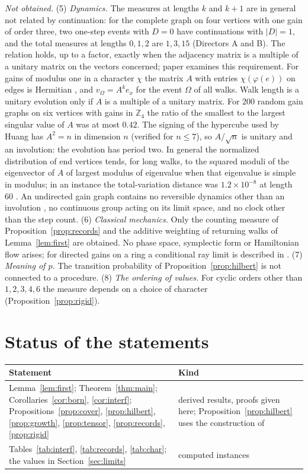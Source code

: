 \emph{Not obtained.} (5) \emph{Dynamics.} The measures at lengths $k$ and $k+1$ are in general not related by continuation: for the complete graph on four vertices with one gain of order three, two one-step events with $D=0$ have continuations with $|D|=1$, and the total measures at lengths $0,1,2$ are $1,3,15$ (Directors A and B). The relation holds, up to a factor, exactly when the adjacency matrix is a multiple of a unitary matrix on the vectors concerned; paper \cite{g9} examines this requirement. For gains of modulus one in a character $\chi$ the matrix $A$ with entries $\chi(\varphi(e))$ on edges is Hermitian \cite{reff,cdd}, and $v_\Omega=A^ke_x$ for the event $\Omega$ of all walks. Walk length is a unitary evolution only if $A$ is a multiple of a unitary matrix. For $200$ random gain graphs on six vertices with gains in $\mathbb{Z}_4$ the ratio of the smallest to the largest singular value of $A$ was at most $0.42$. The signing of the hypercube used by Huang \cite{huang} has $A^2=n$ in dimension $n$ (verified for $n\le7$), so $A/\sqrt n$ is unitary and an involution: the evolution has period two. In general the normalized distribution of end vertices tends, for long walks, to the squared moduli of the eigenvector of $A$ of largest modulus of eigenvalue when that eigenvalue is simple in modulus; in an instance the total-variation distance was $1.2\times10^{-8}$ at length $60$ \cite{comp2}. An undirected gain graph contains no reversible dynamics other than an involution \cite{g9}, no continuous group acting on its limit space, and no clock other than the step count. (6) \emph{Classical mechanics.} Only the counting measure of Proposition~\ref{prop:records} and the additive weighting of returning walks of Lemma~\ref{lem:first} are obtained. No phase space, symplectic form or Hamiltonian flow arises; for directed gains on a ring a conditional ray limit is described in \cite{g9}. (7) \emph{Meaning of $p$.} The transition probability of Proposition~\ref{prop:hilbert} is not connected to a procedure. (8) \emph{The ordering of values.} For cyclic orders other than $1,2,3,4,6$ the measure depends on a choice of character (Proposition~\ref{prop:rigid}).

\section{Status of the statements}

\begin{center}\small
\begin{tabular}{@{}p{}p{}@{}}\toprule
Statement & Kind\\\midrule
Lemma~\ref{lem:first}; Theorem~\ref{thm:main}; Corollaries~\ref{cor:born}, \ref{cor:interf}; Propositions~\ref{prop:cover}, \ref{prop:hilbert}, \ref{prop:growth}, \ref{prop:tensor}, \ref{prop:records}, \ref{prop:rigid} & derived results, proofs given here; Proposition~\ref{prop:hilbert} uses the construction of \cite{djs}\\
Tables~\ref{tab:interf}, \ref{tab:records}, \ref{tab:char}; the values in Section~\ref{sec:limits} & computed instances\\\bottomrule
\end{tabular}
\end{center}

